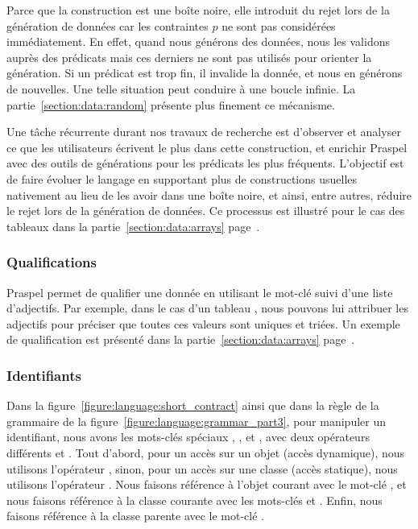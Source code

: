 Parce que la construction  est une boîte noire, elle introduit du rejet
lors de la génération de données car les contraintes $p$ ne sont pas considérées
immédiatement. En effet, quand nous générons des données, nous les validons
auprès des prédicats mais ces derniers ne sont pas utilisés pour orienter la
génération. Si un prédicat est trop fin, il invalide la donnée, et nous en
générons de nouvelles. Une telle situation peut conduire à une boucle infinie.
La partie~\ref{section:data:random} présente plus finement ce mécanisme.

Une tâche récurrente durant nos travaux de recherche est d'observer et analyser
ce que les utilisateurs écrivent le plus dans cette construction, et enrichir
Praspel avec des outils de générations pour les prédicats les plus fréquents.
L'objectif est de faire évoluer le langage en supportant plus de constructions
usuelles nativement au lieu de les avoir dans une boîte noire, et ainsi, entre
autres, réduire le rejet lors de la génération de données. Ce processus est
illustré pour le cas des tableaux dans la partie~\ref{section:data:arrays}
page~\pageref{section:data:arrays}.

\subsubsection{Qualifications}

Praspel permet de qualifier une donnée en utilisant le mot-clé  suivi
d'une liste d'adjectifs. Par exemple, dans le cas d'un tableau , nous
pouvons lui attribuer les adjectifs  pour préciser que
toutes ces valeurs sont uniques et triées. Un exemple de qualification est
présenté dans la partie~\ref{section:data:arrays}
page~\pageref{section:data:arrays}.

\subsubsection{Identifiants}

Dans la figure~\ref{figure:language:short_contract} ainsi que dans la règle
 de la grammaire de la
figure~\ref{figure:language:grammar_part3}, pour manipuler un identifiant, nous
avons les mots-clés spéciaux , ,  et
, avec deux opérateurs différents \code{->} et \code{::}. Tout
d'abord, pour un accès sur un objet (accès dynamique), nous utilisons
l'opérateur \code{->}, sinon, pour un accès sur une classe (accès statique),
nous utilisons l'opérateur \code{::}. Nous faisons référence à l'objet courant
avec le mot-clé , et nous faisons référence à la classe courante avec
les mots-clés  et . Enfin, nous faisons référence à la
classe parente avec le mot-clé .

